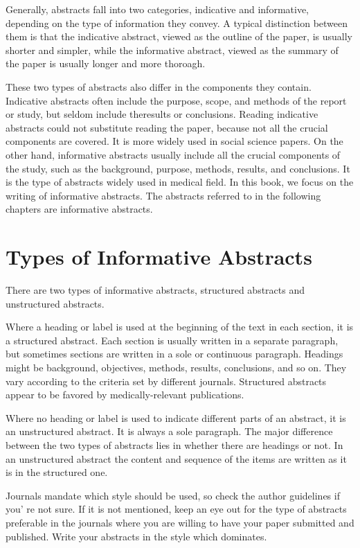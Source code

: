 \documentclass[a4paper]{ctexbook}
\begin{document}
Generally, abstracts fall into two categories, indicative and informative, depending on the type of information they convey. A typical distinction between them is that the indicative abstract, viewed as the outline of the paper, is usually shorter and simpler, while the informative abstract, viewed as the summary of the paper is usually longer and more thoroagh. 

These two types of abstracts also differ in the components they contain. Indicative abstracts often include the purpose, scope, and methods of the report or study, but seldom include theresults or conclusions. Reading indicative abstracts could not substitute reading the paper, because not all the crucial components are covered. It is more widely used in social science papers. On the other hand, informative abstracts usually include all the crucial components of the study, such as the background, purpose, methods, results, and conclusions. It is the type of abstracts widely used in medical field. In this book, we focus on the writing of informative abstracts. The abstracts referred to in the following chapters are informative abstracts.

\section{Types of Informative Abstracts}

There are two types of informative abstracts, structured abstracts and unstructured abstracts.

Where a heading or label is used at the beginning of the text in each section, it is a structured abstract. Each section is usually written in a separate paragraph, but sometimes sections are written in a sole or continuous paragraph. Headings might be background, objectives, methods, results, conclusions, and so on. They vary according to the criteria set by different journals. Structured abstracts appear to be favored by medically-relevant publications.

Where no heading or label is used to indicate different parts of an abstract, it is an unstructured abstract. It is always a sole paragraph. The major difference between the two types of abstracts lies in whether there are headings or not. In an unstructured abstract the content and sequence of the items are written as it is in the structured one.

Journals mandate which style should be used, so check the author guidelines if you' re not sure. If it is not mentioned, keep an eye out for the type of abstracts preferable in the journals where you are willing to have your paper submitted and published. Write your abstracts in the style which dominates.
\end{document}
